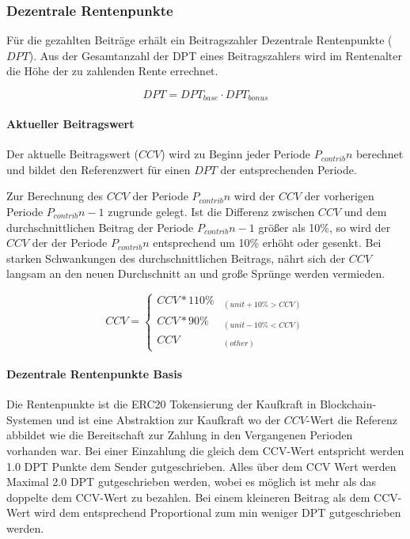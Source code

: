 \subsubsection*{Dezentrale Rentenpunkte}
Für die gezahlten Beiträge erhält ein Beitragszahler Dezentrale Rentenpunkte
($DPT$). Aus der Gesamtanzahl der DPT eines Beitragszahlers wird im Rentenalter
die Höhe der zu zahlenden Rente errechnet.

\begin{equation}
DPT = DPT_{base} \cdot DPT_{bonus}
\end{equation}

\paragraph*{Aktueller Beitragswert}
Der aktuelle Beitragswert ($CCV$) wird zu Beginn jeder Periode 
$P_{contrib}{n}$ berechnet und bildet den Referenzwert für einen $DPT$ der
entsprechenden Periode.

Zur Berechnung des $CCV$ der Periode $P_{contrib}{n}$ wird der $CCV$ der vorherigen
Periode $P_{contrib}{n-1}$ zugrunde gelegt. Ist die Differenz zwischen $CCV$ und dem
durchschnittlichen Beitrag der Periode $P_{contrib}{n-1}$ größer als 10\%, so wird
der $CCV$ der der Periode $P_{contrib}{n}$ entsprechend um 10\% erhöht oder gesenkt.
Bei starken Schwankungen des durchschnittlichen Beitrags, nährt sich der $CCV$ langsam an den neuen Durchschnitt an und große Sprünge werden vermieden.

\begin{equation}
CCV = \begin{cases} 
CCV * 110\% & _{(unit+10\% > CCV)} \\
CCV * 90\% & _{(unit-10\% < CCV)} \\
CCV & _{(other)}
\end{cases}
\end{equation}

\paragraph*{Dezentrale Rentenpunkte Basis}
Die Rentenpunkte ist die ERC20 Tokensierung der Kaufkraft in Blockchain-Systemen und ist eine Abstraktion zur Kaufkraft wo der $CCV$-Wert die Referenz abbildet wie die Bereitschaft zur Zahlung in den Vergangenen Perioden vorhanden war. Bei einer Einzahlung die gleich dem CCV-Wert entspricht werden 1.0 DPT Punkte dem Sender gutgeschrieben. Alles über dem CCV Wert werden Maximal 2.0 DPT gutgeschrieben werden, wobei es möglich ist mehr als das doppelte dem CCV-Wert zu bezahlen. Bei einem kleineren Beitrag als dem CCV-Wert wird dem entsprechend Proportional zum min weniger DPT gutgeschrieben werden.

